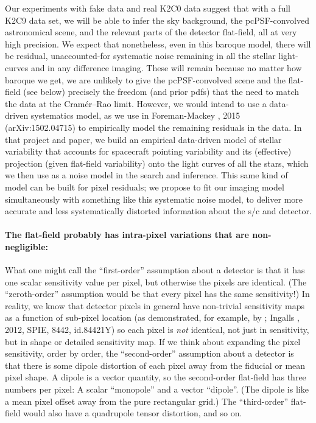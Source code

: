 \documentclass[12pt,preprint]{aastex}
\begin{document}
Our experiments with fake data and real K2C0 data suggest that with a
full K2C9 data set, we will be able to infer the sky background, the
pcPSF-convolved astronomical scene, and the relevant parts of the
detector flat-field, all at very high precision.
We expect that nonetheless, even in this baroque model, there will
be residual, unaccounted-for systematic noise remaining in all the
stellar light-curves and in any difference imaging.
These will remain because no matter how baroque we get, we are
unlikely to give the pcPSF-convolved scene and the flat-field (see
below) precisely the freedom (and prior pdfs) that the need to match
the data at the Cram\'er--Rao limit.
However, we would intend to use a data-driven systematics model, as we
use in Foreman-Mackey \etal, 2015 (arXiv:1502.04715) to empirically
model the remaining residuals in the data.
In that project and paper, we build an empirical data-driven model of
stellar variability that accounts for spacecraft pointing variability
and its (effective) projection (given flat-field variability) onto the
light curves of all the stars, which we then use as a noise model in
the search and inference.
This same kind of model can be built for pixel residuals;
we propose to fit our imaging model simultaneously with something like this systematic
noise model, to deliver more accurate and less systematically distorted
information about the s/c and detector.

\paragraph{The flat-field probably has intra-pixel variations that are non-negligible:}

What one might call the ``first-order'' assumption about a detector is
that it has one scalar sensitivity value per pixel, but otherwise the
pixels are identical.
(The ``zeroth-order'' assumption would be that every pixel has the same
sensitivity!)
In reality, we know that detector pixels in general have non-trivial sensitivity maps as a
function of sub-pixel location (as demonstrated, for example, by \spitzer;
Ingalls \etal, 2012, SPIE, 8442, id.84421Y)
so each pixel is \emph{not} identical,
not just in sensitivity, but in shape or detailed sensitivity map.
If we think about expanding the pixel sensitivity, order by order, the
``second-order'' assumption about a detector is that there is some dipole
distortion of each pixel away from the fiducial or mean pixel shape.
A dipole is a vector quantity, so the second-order flat-field has
three numbers per pixel: A scalar ``monopole'' and a vector
``dipole''.
(The dipole is like a mean pixel offset away from the pure rectangular
grid.)
The ``third-order'' flat-field would also have a quadrupole tensor
distortion, and so on.
\end{document}
